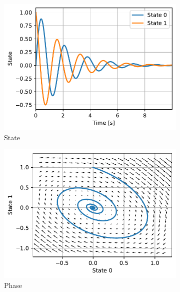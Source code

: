 \documentclass{cmc}
\begin{document}
\begin{figure}[H]
  \centering
  \begin{subfigure}[b]{0.49\textwidth}
    \centering
    \includegraphics[width=1.0\textwidth]{figures/system_integration_state}
    \caption{\label{fig:pend-state} State}
  \end{subfigure}
  \begin{subfigure}[b]{0.49\textwidth}
    \centering
    \includegraphics[width=1.0\textwidth]{figures/system_integration_phase}
    \caption{\label{fig:pend-phase} Phase}
  \end{subfigure}
  \caption{\label{fig:system-pendulum}}
\end{figure}
\end{document}
